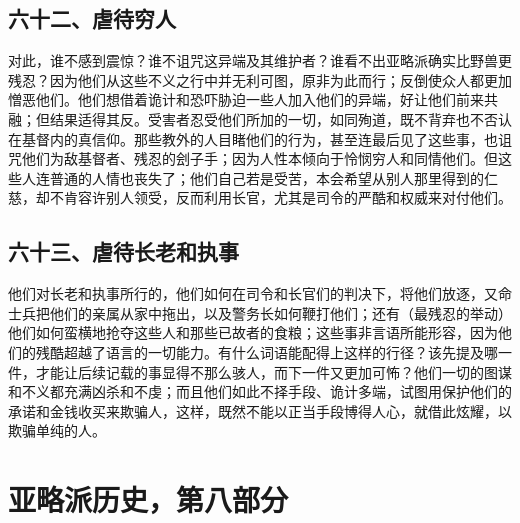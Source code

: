 
\subsection{六十二、虐待穷人}

对此，谁不感到震惊？谁不诅咒这异端及其维护者？谁看不出亚略派确实比野兽更残忍？因为他们从这些不义之行中并无利可图，原非为此而行；反倒使众人都更加憎恶他们。他们想借着诡计和恐吓胁迫一些人加入他们的异端，好让他们前来共融；但结果适得其反。受害者忍受他们所加的一切，如同殉道，既不背弃也不否认在基督内的真信仰。那些教外的人目睹他们的行为，甚至连最后见了这些事，也诅咒他们为敌基督者、残忍的刽子手；因为人性本倾向于怜悯穷人和同情他们。但这些人连普通的人情也丧失了；他们自己若是受苦，本会希望从别人那里得到的仁慈，却不肯容许别人领受，反而利用长官，尤其是司令的严酷和权威来对付他们。\par


\subsection{六十三、虐待长老和执事}

他们对长老和执事所行的，他们如何在司令和长官们的判决下，将他们放逐，又命士兵把他们的亲属从家中拖出，以及警务长如何鞭打他们；还有（最残忍的举动）他们如何蛮横地抢夺这些人和那些已故者的食粮；这些事非言语所能形容，因为他们的残酷超越了语言的一切能力。有什么词语能配得上这样的行径？该先提及哪一件，才能让后续记载的事显得不那么骇人，而下一件又更加可怖？他们一切的图谋和不义都充满凶杀和不虔；而且他们如此不择手段、诡计多端，试图用保护他们的承诺和金钱收买来欺骗人，这样，既然不能以正当手段博得人心，就借此炫耀，以欺骗单纯的人。\par



\section{亚略派历史，第八部分}


